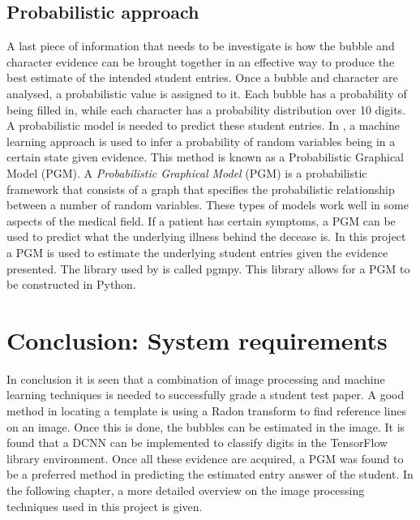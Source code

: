 \subsection{Probabilistic approach}
A last piece of information that needs to be investigate is how the bubble and character evidence can be brought together in an effective way to produce the best estimate of the intended student entries. Once a bubble and character are analysed, a probabilistic value is assigned to it. Each bubble has a probability of being filled in, while each character has a probability distribution over 10 digits. A probabilistic model is needed to predict these student entries. In \citet{pgmPy}, a machine learning approach is used to infer a probability of random variables being in a certain state given evidence. This method is known as a Probabilistic Graphical Model (PGM). A \textsl{Probabilistic Graphical Model} (PGM) is a probabilistic framework that consists of a graph that specifies the probabilistic relationship between a number of random variables. These types of models work well in some aspects of the medical field. If a patient has certain symptoms, a PGM can be used to predict what the underlying illness behind the decease is. In this project a PGM is used to estimate the underlying student entries given the evidence presented. The library used by \citet{pgmPy} is called pgmpy. This library allows for a PGM to be constructed in Python. 

\section{Conclusion: System requirements}
In conclusion it is seen that a combination of image processing and machine learning techniques is needed to successfully grade a student test paper. A good method in locating a template is using a Radon transform to find reference lines on an image. Once this is done, the bubbles can be estimated in the image. It is found that a DCNN can be implemented to classify digits in the TensorFlow library environment. Once all these evidence are acquired, a PGM was found to be a preferred method in predicting the estimated entry answer of the student.
In the following chapter, a more detailed overview on the image processing techniques used in this project is given.
